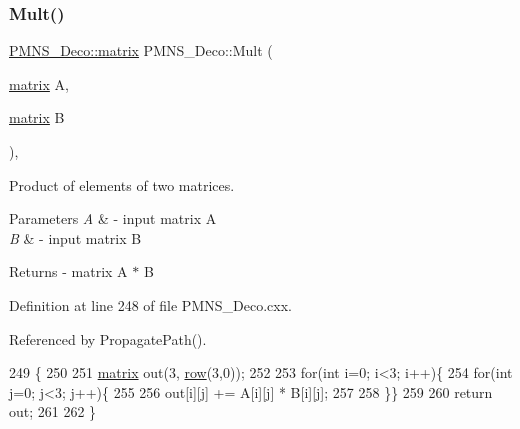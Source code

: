 \subsubsection{\texorpdfstring{Mult()}{Mult()}}
{\footnotesize\ttfamily \hyperlink{classOscProb_1_1PMNS__Deco_a77b4e0c041b6268910a270be0f5387c9}{P\+M\+N\+S\+\_\+\+Deco\+::matrix} P\+M\+N\+S\+\_\+\+Deco\+::\+Mult (\begin{DoxyParamCaption}\item[{\hyperlink{classOscProb_1_1PMNS__Deco_a77b4e0c041b6268910a270be0f5387c9}{matrix}}]{A,  }\item[{\hyperlink{classOscProb_1_1PMNS__Deco_a77b4e0c041b6268910a270be0f5387c9}{matrix}}]{B }\end{DoxyParamCaption})\hspace{0.3cm}{\ttfamily [protected]}, {\ttfamily [virtual]}}

Product of elements of two matrices.


\begin{DoxyParams}{Parameters}
{\em A} & -\/ input matrix A \\
\hline
{\em B} & -\/ input matrix B\\
\hline
\end{DoxyParams}
\begin{DoxyReturn}{Returns}
-\/ matrix A $\ast$ B 
\end{DoxyReturn}


Definition at line 248 of file P\+M\+N\+S\+\_\+\+Deco.\+cxx.



Referenced by Propagate\+Path().


\begin{DoxyCode}
249 \{
250 
251   \hyperlink{classOscProb_1_1PMNS__Deco_a77b4e0c041b6268910a270be0f5387c9}{matrix} out(3, \hyperlink{classOscProb_1_1PMNS__Deco_a34634741bc68bc1c524cf47f44e7f5b6}{row}(3,0));
252   
253   \textcolor{keywordflow}{for}(\textcolor{keywordtype}{int} i=0; i<3; i++)\{
254   \textcolor{keywordflow}{for}(\textcolor{keywordtype}{int} j=0; j<3; j++)\{
255   
256     out[i][j] += A[i][j] * B[i][j];
257 
258   \}\}
259   
260   \textcolor{keywordflow}{return} out;
261 
262 \}
\end{DoxyCode}
\mbox{\label{classOscProb_1_1PMNS__Deco_aa81f47ea36207b90a5feb9849060032d}} 

